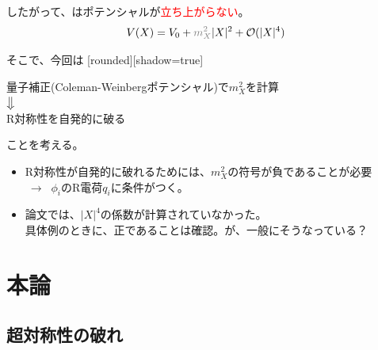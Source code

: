 \documentclass[
  unicode,a4paper,9pt,
  xcolor = {dvipsnames,svgnames},
  hyperref ={colorlinks=true,citecolor=Navy,linkcolor=NavyBlue,urlcolor=purple},
  ja=standard,lualatex
]{beamer}
\begin{document}
\begin{frame}
  \frametitle{\subsecname}

  したがって、はポテンシャルが\textcolor{red}{立ち上がらない}。
  \begin{equation}
    V(X)
    =
    V_{0}
    +
    \textcolor{gray}{m_{X}^2}|X|^2
    +
    \mathcal{O}(|X|^4)
    \nonumber
  \end{equation}

  \pause

  そこで、今回は
  [rounded][shadow=true]
  \begin{block}{}
    \centering
    量子補正(Coleman-Weinbergポテンシャル)で$m_{X}^2$を計算\\
    ${\big \Downarrow}$\\
    R対称性を自発的に破る
  \end{block}
  ことを考える。

  \begin{itemize}
    \item
          R対称性が自発的に破れるためには、$m_{X}^2$の符号が負であることが必要\\
          $\ \longrightarrow\ $ $\phi_i$のR電荷$q_{i}$に条件がつく。
    \item
          論文では、$|X|^4$の係数が計算されていなかった。\\
          具体例のときに、正であることは確認。が、一般にそうなっている？
  \end{itemize}

\end{frame}

\section{本論}

\begin{frame}[plain]
  \huge \secname
\end{frame}


\subsection{超対称性の破れ}
\end{document}
